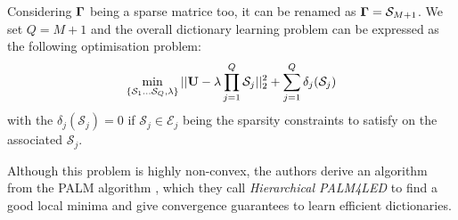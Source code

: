 Considering ${\mathbf{\Gamma}}$ being a sparse matrice too, it can be renamed as ${\mathbf{\Gamma}} = \mathcal{S}_{M+1}$. We set $Q = M+1$ and the overall dictionary learning problem can be expressed as the following optimisation problem:
%
\begin{equation}
\label{eq:problem_gribon}
\min_{\{\mathcal{S}_1 \dots \mathcal{S}_Q, \lambda\}} ||{\mathbf{U}} - \lambda \prod_{j=1}^{Q}{\mathcal{S}_j}||_2^2 + \sum_{j=1}^{Q} \delta_j(\mathcal{S}_j)
\end{equation}
%
with the $\delta_j(\mathcal{S}_j) = 0$ if $\mathcal{S}_j \in \mathcal{E}_j$ being the sparsity constraints to satisfy on the associated $\mathcal{S}_j$.

Although this problem is highly non-convex, the authors derive an algorithm from the PALM algorithm \cite{bolte2014proximal}, which they call \textit{Hierarchical PALM4LED} to find a good local minima and give convergence guarantees to learn efficient dictionaries.
